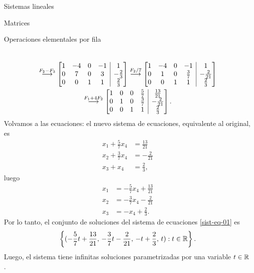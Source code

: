 \begin{chapter}{Sistemas lineales}
\begin{section}{Matrices}
\begin{subsection}{Operaciones elementales por fila}
\begin{ejemplo*}
\begin{multline*}
                    \\
                    \stackrel{F_2- F_3}{\longrightarrow} 
                    \left[\begin{array}{@{}*{4}{c}|c@{}}  1&-4 &0&-1&1 \\ 0& 7&0& 3&-\frac{2}{3} \\ 0&0&1&1&\frac{2}{3} \end{array}\right]
                    \stackrel{F_2/7}{\longrightarrow} 
                    \left[\begin{array}{@{}*{4}{c}|c@{}}  1&-4 &0&-1&1\\ 0& 1&0& \frac37&-\frac{2}{21}\\ 0&0&1&1&\frac{2}{3}\end{array}\right]
                    \\
                    \stackrel{F_1 +4F_2}{\longrightarrow} 
                    \left[\begin{array}{@{}*{4}{c}|c@{}} 1&0&0&\frac{5}{7}&\frac{13}{21}\\0&1&0&\frac37&-\frac{2}{21} \\ 0&0&1&1&\frac{2}{3}\end{array}\right].
                    \end{multline*}
                    Volvamos a las ecuaciones: el nuevo sistema de ecuaciones, equivalente al original, es
                    \begin{align*}
                    x_1 +\frac{5}{7}x_4 &= \frac{13}{21} \\
                    x_2 + \frac{3}{7}x_4 &=-\frac{2}{21} \\
                    x_3 +x_4 &= \frac{2}{3}, 
                    \end{align*}
                    luego 
                    \begin{align*}
                    x_1  &=-\frac{5}{7}x_4 + \frac{13}{21}\\
                    x_2  &=- \frac{3}{7}x_4 -\frac{2}{21} \\
                    x_3  &= -x_4+\frac{2}{3}. 
                    \end{align*}
                    Por lo tanto, el conjunto de soluciones del sistema de ecuaciones \eqref{sist-eq-01} es
                    $$
                    \left\{(-\frac{5}{7}t+ \frac{13}{21},\,- \frac{3}{7}t-\frac{2}{21},\, -t+\frac{2}{3},\,t): t \in \mathbb R \right\}.
                    $$
                    Luego, el sistema tiene infinitas soluciones parametrizadas por una variable $t \in \mathbb R$.
                \end{ejemplo*}
                

\end{subsection}
\end{section}
\end{chapter}
